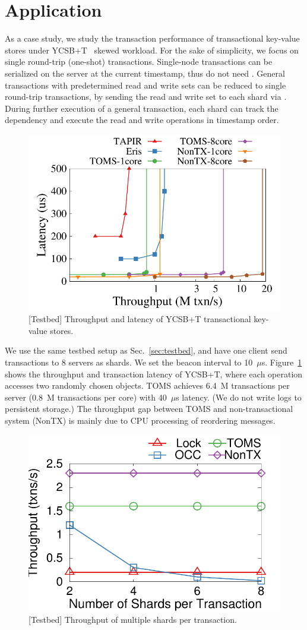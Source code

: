 \section{Application}
\label{sec:application}

As a case study, we study the transaction performance of transactional key-value stores under YCSB+T~\cite{dey2014ycsbt} skewed workload.
For the sake of simplicity, we focus on single round-trip (one-shot) transactions. Single-node transactions can be serialized on the server at the current timestamp, thus do not need \sys. General transactions with predetermined read and write sets can be reduced to single round-trip transactions, by sending the read and write set to each shard via \sys. During further execution of a general transaction, each shard can track the dependency and execute the read and write operations in timestamp order.




\begin{figure}[t]
\centering
\includegraphics[width=.45\textwidth]{gnuplot/ycsb.pdf}
\caption{[Testbed] Throughput and latency of YCSB+T transactional key-value stores.}
\label{fig:ycsb}
\end{figure}


We use the same testbed setup as Sec.~\ref{sec:testbed}, and have one \sys client send transactions to 8 \sys servers as shards. We set the beacon interval to 10~$\mu$s.
Figure~\ref{fig:ycsb} shows the throughput and transaction latency of YCSB+T, where each operation accesses two randomly chosen objects.
TOMS achieves 6.4~M transactions per server (0.8~M transactions per core) with 40~$\mu$s latency. (We do not write logs to persistent storage.)
The throughput gap between TOMS and non-transactional system (NonTX) is mainly due to CPU processing of reordering messages.

\begin{figure}[t]
\centering
\includegraphics[width=.35\textwidth]{gnuplot/multishard.pdf}
\caption{[Testbed] Throughput of multiple shards per transaction.}
\label{fig:multishard}
\vspace{-10pt}
\end{figure}

